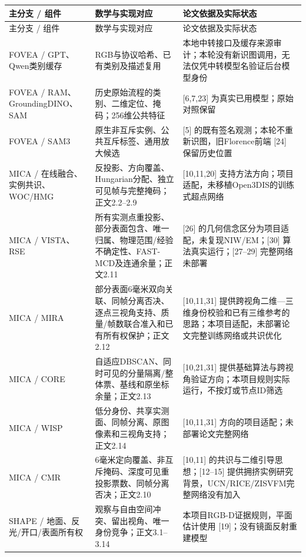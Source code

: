 \documentclass[UTF8,fontset=fandol]{ctexart}
\begin{document}
{\small
\begin{longtable}{|p{}|p{}|p{}|}
\hline
主分支 / 组件 & 数学与实现对应 & 论文依据及实际状态 \\ \hline
\endfirsthead
\hline
主分支 / 组件 & 数学与实现对应 & 论文依据及实际状态 \\ \hline
\endhead
FOVEA / GPT、Qwen类别缓存 & RGB与协议哈希、已有类别及描述复用 & 本地中转接口及缓存来源审计；本轮没有新识图调用，无法仅凭中转模型名验证后台模型身份 \\ \hline
FOVEA / RAM、GroundingDINO、SAM & 历史原始流程的类别、二维定位、掩码；256维公共特征 & [6,7,23] 为真实已用模型；原始对照保留 \\ \hline
FOVEA / SAM3 & 原生非互斥实例、公共互斥标签、通用放大候选 & [5] 的既有签名观测；本轮不重新识图，旧Florence前端 [24] 保留历史位置 \\ \hline
MICA / 在线融合、实例共识、WOC/HMG & 反投影、方向覆盖、Hungarian分配、独立可见帧与完整掩码；正文2.2–2.9 & [10,11,20] 支持方法方向；项目适配，未移植Open3DIS的训练式超点网络 \\ \hline
MICA / VISTA、RSE & 所有实测点重投影、部分表面包含、唯一归属、物理范围/经验不确定性、FAST-MCD及连通余量；正文2.11 & [26] 的几何信念区分为项目适配，未复现NIW/EM；[30] 算法真实运行；[27–29] 完整网络未部署 \\ \hline
MICA / MIRA & 部分表面6毫米双向关联、同帧分离否决、逐点三视角支持、质量/帧数联合准入和已有所有权保护；正文2.12 & [10,11,31] 提供跨视角二维—三维身份校验和已有三维参考的思路；本项目适配，未部署论文完整训练网络或共识优化 \\ \hline
MICA / CORE & 自适应DBSCAN、同时可见的分量隔离/整体票、基线和原坐标余量；正文2.13 & [10,21,31] 提供基础算法与跨视角验证方向；本项目规则实际运行，不按灯或节点ID筛选 \\ \hline
MICA / WISP & 低分身份、共享实测面、同帧分离、原图像素和三视角支持；正文2.14 & [10,11,31] 方向的项目适配；未部署论文完整网络 \\ \hline
MICA / CMR & 6毫米定向覆盖、非互斥掩码、深度可见重投影票数、同帧分离否决；正文2.10 & [10,11] 的共识与二维引导思想；[12–15] 提供拥挤实例研究背景，UCN/RICE/ZISVFM完整网络没有加入 \\ \hline
SHAPE / 地面、反光/开口/表面所有权 & 观察与自由空间冲突、留出视角、唯一身份竞争；正文3.1–3.14 & 本项目RGB-D证据规则，平面估计使用 [19]；没有镜面反射重建模型 \\ \hline

\end{longtable}}
\end{document}
